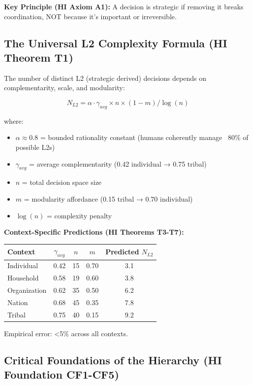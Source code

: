 \documentclass[11pt, a4paper]{article}
\begin{document}
\textbf{Key Principle (HI Axiom A1):} A decision is strategic if removing it breaks coordination, NOT because it's important or irreversible.

\subsection{The Universal L2 Complexity Formula (HI Theorem T1)} \label{sec:ch15-part2b}

The number of distinct L2 (strategic derived) decisions depends on complementarity, scale, and modularity:

$$N_{L2} = \alpha \cdot \gamma_{avg} \times n \times (1-m) / \log(n)$$

where:

\begin{itemize}[nosep]
    \item $\alpha \approx 0.8$ = bounded rationality constant (humans coherently manage ~80\% of possible L2s)
    \item $\gamma_{avg}$ = average complementarity (0.42 individual → 0.75 tribal)
    \item $n$ = total decision space size
    \item $m$ = modularity affordance (0.15 tribal → 0.70 individual)
    \item $\log(n)$ = complexity penalty
\end{itemize}

\textbf{Context-Specific Predictions (HI Theorems T3-T7):}

\begin{center}
\begin{tabular}{|l|c|c|c|c|}
\hline
\textbf{Context} & $\gamma_{avg}$ & $n$ & $m$ & Predicted $N_{L2}$ \\
\hline
Individual & 0.42 & 15 & 0.70 & 3.1 \\
Household & 0.58 & 19 & 0.60 & 3.8 \\
Organization & 0.62 & 35 & 0.50 & 6.2 \\
Nation & 0.68 & 45 & 0.35 & 7.8 \\
Tribal & 0.75 & 40 & 0.15 & 9.2 \\
\hline
\end{tabular}
\end{center}

Empirical error: <5\% across all contexts.

\subsection{Critical Foundations of the Hierarchy (HI Foundation CF1-CF5)} \label{sec:ch15-part2c}
\end{document}
